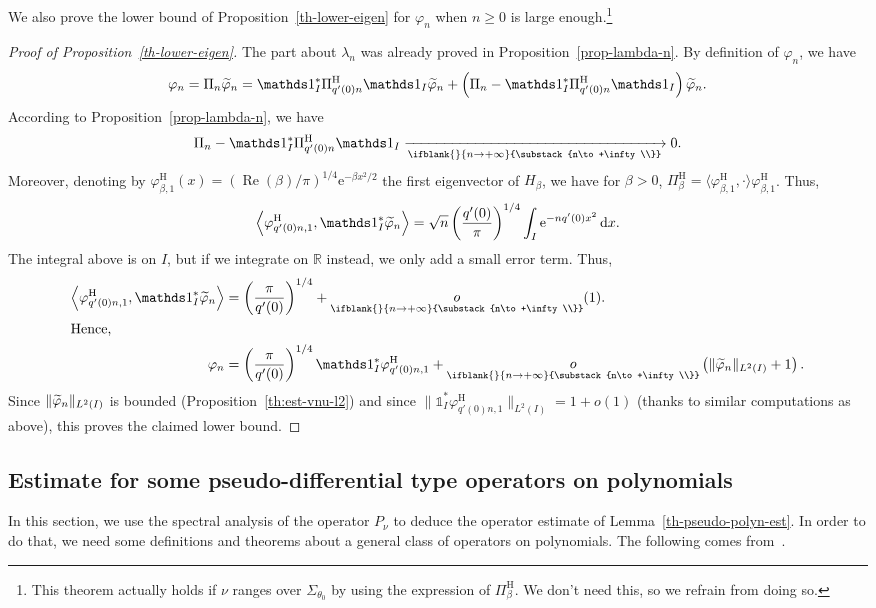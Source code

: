 \documentclass[AHL,Unicode,longabstracts,published]{cedram}
\renewcommand{\geq}{\geqslant}
\newcommand{\littleo}[3][]{\mathop{o}\limits_{\ifblank{#1}{#2 \to #3}{\substack{#2\to #3\\#1}}}}
\newcommand{\1}{\mathds 1}
\newcommand{\limt}[3][]{\xrightarrow[\ifblank{#1}{#2 \to #3}{\substack{#2\to #3\\#1}}]{}}
\DeclareMathOperator{\Ree}{Re}
\newcommand{\R}{\mathbb{R}}
\newcommand{\diff}[1][-3]{\ensuremath{\mathop{}\mkern#1mu\mathrm{d}}}
\newcommand{\eu}{\mathrm e}
\newcommand{\sector}[1][\theta_0]{\Sigma_{#1}}
\newcommand{\h}{{\mathrm{H}}}
\renewcommand{\b}{\beta}
\renewcommand{\l}{\lambda}
\newcommand{\f}{\varphi}
\let\oldtilde\tilde
\renewcommand*{\tilde}[1]{\mathchoice{\widetilde{#1}}{\widetilde{#1}}{\oldtilde{#1}}{\oldtilde{#1}}}
\DeclareMathOperator{\Ree}{Re}
\begin{document}
We also prove the lower bound of Proposition~\ref{th-lower-eigen} for $\f_n$ when $n\geq 0$ is large enough.\footnote{This theorem actually holds if $\nu$ ranges over $\sector$ by using the expression of $\Pi_\b^\h$. We don't need this, so we refrain from doing so.}

\begin{proof}[Proof of Proposition~\ref{th-lower-eigen}]
The part about $\l_n$ was already proved in Proposition~\ref{prop-lambda-n}. By definition of $\f_n$, we have
\[
\f_n = \Pi_n \tilde \f_n = \1_I^*\Pi^\h_{q'(0)n} \1_I \tilde \f_n + \left(\Pi_n - \1_I^*\Pi^\h_{q'(0)n}\1_I\right)\tilde \f_n.
\]
According to Proposition~\ref{prop-lambda-n}, we have
\[
\Pi_n - \1_I^*\Pi^\h_{q'(0)n}\1_I \limt{n}{+\infty} 0.
\]
Moreover, denoting by $\f_{\b,1}^\h(x) = (\Ree(\b)/\pi)^{1/4}\eu^{-\b x^2\!/2}$ the first eigenvector of $H_\b$, we have for $\b>0$, $\Pi_\b^\h = \langle \f_{\b,1}^\h,\cdot\rangle \f_{\b,1}^\h$. Thus,
\[
\left\langle \f_{q'(0)n,1}^\h, \1^*_I \tilde \f_n\right\rangle = \sqrt n \left(\frac{q'(0)}{\pi}\right)^{1/4} \int_I \eu^{- nq'(0)x^2} \diff x.
\]
The integral above is on $I$, but if we integrate on $\R$ instead, we only add a small error term. Thus,
\begin{align*}
\left\langle \f_{q'(0)n,1}^\h, \1^*_I \tilde \f_n\right\rangle &= \left(\frac\pi{q'(0)}\right)^{1/4} + \littleo{n}{+\infty}(1).
\\
\intertext{Hence,}
\f_n &= \left(\frac{\pi}{q'(0)}\right)^{1/4}\1_I^*\f_{q'(0)n,1}^\h + \littleo{n}{+\infty}\left(\|\tilde \f_n\|_{L^2(I)} +1\right).
\end{align*}
Since $\|\tilde \f_n\|_{L^2(I)}$ is bounded (Proposition~\ref{th:est-vnu-l2}) and since $\|\1_I^* \f_{q'(0)n,1}^\h\|_{L^2(I)} = 1 + o(1)$ (thanks to similar computations as above), this proves the claimed lower bound.
\end{proof}

\subsection{Estimate for some pseudo-differential type operators on polynomials}\label{sec-pseudo-polyn-est}


In this section, we use the spectral analysis of the operator $P_\nu$ to deduce the operator estimate of Lemma~\ref{th-pseudo-polyn-est}. In order to do that, we need some definitions and theorems about a general class of operators on polynomials. The following comes from~\cite[Definition~9 \& Theorem~18]{Koenig17}.
\end{document}
